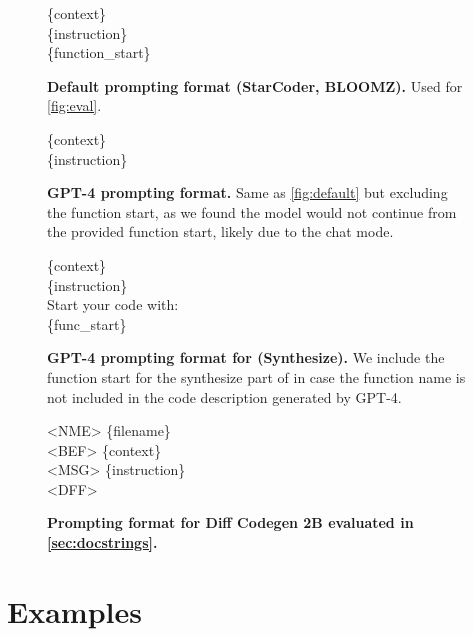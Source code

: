 \begin{figure}[htbp]
\hrulefill

\{context\}\\\{instruction\}\\\{function\_start\}

\hrulefill
\caption[]{\textbf{Default prompting format (StarCoder, BLOOMZ).} Used for \autoref{fig:eval}.}
\label{fig:default}
\end{figure}

\begin{figure}[htbp]
\hrulefill

\{context\}\\\{instruction\}

\hrulefill
\caption[]{\textbf{GPT-4 prompting format.} Same as \autoref{fig:default} but excluding the function start, as we found the model would not continue from the provided function start, likely due to the chat mode.}
\label{fig:gpt4}
\end{figure}

\begin{figure}[htbp]
\hrulefill

\{context\}\\\{instruction\}\\Start your code with:\\\{func\_start\}

\hrulefill
\caption[]{\textbf{GPT-4 prompting format for \evale{} (Synthesize).} We include the function start for the synthesize part of \evale{} in case the function name is not included in the code description generated by GPT-4.}
\label{fig:gpt4funcstart}
\end{figure}


\begin{figure}[htbp]
\hrulefill

<NME> \{filename\}\\<BEF> \{context\}\\<MSG> \{instruction\}\\<DFF>

\hrulefill
\caption[]{\textbf{Prompting format for Diff Codegen 2B evaluated in \autoref{sec:docstrings}.}}
\label{fig:diff}
\end{figure}

\FloatBarrier


\section{Examples}
\label{sec:examples}

